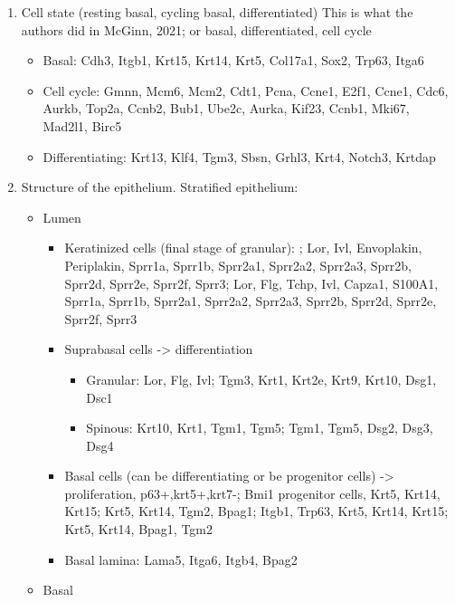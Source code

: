 \documentclass[
  letterpaper,
  DIV=11,
  numbers=noendperiod]{scrreprt}
\providecommand{\tightlist}{%
  \setlength{\itemsep}{0pt}\setlength{\parskip}{0pt}}\usepackage{longtable,booktabs,array}
\begin{document}
\begin{enumerate}
\def\labelenumi{\arabic{enumi}.}
\tightlist
\item
  Cell state (resting basal, cycling basal, differentiated) This is what
  the authors did in McGinn, 2021; or basal, differentiated, cell cycle

  \begin{itemize}
  \tightlist
  \item
    Basal: Cdh3, Itgb1, Krt15, Krt14, Krt5, Col17a1, Sox2, Trp63, Itga6
  \item
    Cell cycle: Gmnn, Mcm6, Mcm2, Cdt1, Pcna, Ccne1, E2f1, Ccne1, Cdc6,
    Aurkb, Top2a, Ccnb2, Bub1, Ube2c, Aurka, Kif23, Ccnb1, Mki67,
    Mad2l1, Birc5
  \item
    Differentiating: Krt13, Klf4, Tgm3, Sbsn, Grhl3, Krt4, Notch3,
    Krtdap
  \end{itemize}
\item
  Structure of the epithelium. Stratified epithelium:

  \begin{itemize}
  \tightlist
  \item
    Lumen

    \begin{itemize}
    \tightlist
    \item
      Keratinized cells (final stage of granular): ; Lor, Ivl,
      Envoplakin, Periplakin, Sprr1a, Sprr1b, Sprr2a1, Sprr2a2, Sprr2a3,
      Sprr2b, Sprr2d, Sprr2e, Sprr2f, Sprr3; Lor, Flg, Tchp, Ivl,
      Capza1, S100A1, Sprr1a, Sprr1b, Sprr2a1, Sprr2a2, Sprr2a3, Sprr2b,
      Sprr2d, Sprr2e, Sprr2f, Sprr3
    \item
      Suprabasal cells -\textgreater{} differentiation

      \begin{itemize}
      \tightlist
      \item
        Granular: Lor, Flg, Ivl; Tgm3, Krt1, Krt2e, Krt9, Krt10, Dsg1,
        Dsc1
      \item
        Spinous: Krt10, Krt1, Tgm1, Tgm5; Tgm1, Tgm5, Dsg2, Dsg3, Dsg4
      \end{itemize}
    \item
      Basal cells (can be differentiating or be progenitor cells)
      -\textgreater{} proliferation, p63+,krt5+,krt7-; Bmi1 progenitor
      cells, Krt5, Krt14, Krt15; Krt5, Krt14, Tgm2, Bpag1; Itgb1, Trp63,
      Krt5, Krt14, Krt15; Krt5, Krt14, Bpag1, Tgm2
    \item
      Basal lamina: Lama5, Itga6, Itgb4, Bpag2
    \end{itemize}
  \item
    Basal
  \end{itemize}
\end{enumerate}
\end{document}
